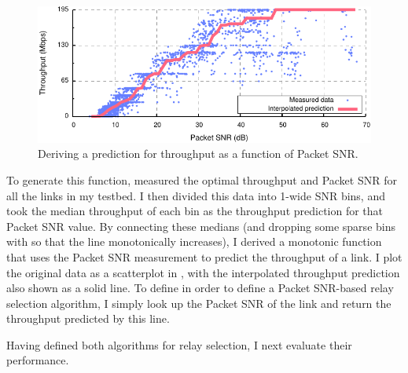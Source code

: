 \begin{figure}[t]
	\centering
	\includegraphics[width=\textwidth]{figures/applications/snr_vs_mbps.pdf}
	\caption[Deriving a prediction for throughput as a function of Packet SNR]{\label{fig:snr_vs_mbps}Deriving a prediction for throughput as a function of Packet SNR.}
\end{figure}

To generate this function, measured the optimal throughput and Packet SNR for all the links in my testbed. I then divided this data into 1\dB-wide SNR bins, and took the median throughput of each bin as the throughput prediction for that Packet SNR value. By connecting these medians (and dropping some sparse bins with so that the line monotonically increases), I derived a monotonic function that uses the Packet SNR measurement to predict the throughput of a link. I plot the original data as a scatterplot in , with the interpolated throughput prediction also shown as a solid line. To define  in order to define a Packet SNR-based relay selection algorithm, I simply look up the Packet SNR of the link and return the throughput predicted by this line.

Having defined both algorithms for relay selection, I next evaluate their performance.

